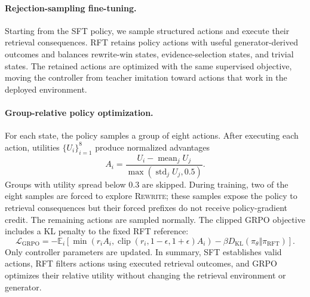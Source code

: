 \paragraph{Rejection-sampling fine-tuning.}
Starting from the SFT policy, we sample structured actions and execute their
retrieval consequences. RFT retains policy actions with useful
generator-derived outcomes and balances rewrite-win states, evidence-selection
states, and trivial states. The retained actions are optimized with the
same supervised objective, moving the controller from teacher imitation toward
actions that work in the deployed environment.

\paragraph{Group-relative policy optimization.}
For each state, the policy samples a group of eight actions. After executing
each action, utilities $\{U_i\}_{i=1}^8$ produce normalized advantages
\begin{equation}
 A_i=\frac{U_i-\operatorname{mean}_j U_j}
 {\max(\operatorname{std}_j U_j,0.5)}.
 \label{eq:advantage}
\end{equation}
Groups with utility spread below $0.3$ are skipped. During training, two of the
eight samples are forced to explore \textsc{Rewrite}; these samples expose the
policy to retrieval consequences but their forced prefixes do not receive
policy-gradient credit. The remaining actions are sampled normally. The
clipped GRPO objective includes a KL penalty to the fixed RFT reference:
\begin{equation}
 \mathcal{L}_{\mathrm{GRPO}}=
 -\mathbb{E}_i\!\left[
 \min(r_iA_i,\operatorname{clip}(r_i,1-\epsilon,1+\epsilon)A_i)
 -\beta D_{\mathrm{KL}}(\pi_\theta\Vert\pi_{\mathrm{RFT}})
 \right].
 \label{eq:grpo}
\end{equation}
Only controller parameters are updated. In summary, SFT establishes valid
actions, RFT filters actions using executed retrieval outcomes, and GRPO
optimizes their relative utility without changing the retrieval environment or
generator.
